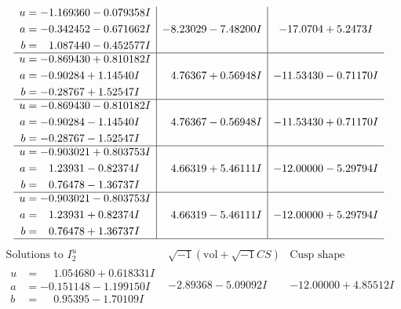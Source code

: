 \documentclass[1p]{elsarticle_modified}
\theoremstyle{definition}
\newcommand{\I}{\sqrt{-1}}
\begin{document}
$$\begin{array}{c|c|c}
\begin{aligned}
u &= -1.169360 - 0.079358 I \\
a &= -0.342452 - 0.671662 I \\
b &= \phantom{-}1.087440 - 0.452577 I\end{aligned}
 & -8.23029 - 7.48200 I & -17.0704 + 5.2473 I \\ \hline\begin{aligned}
u &= -0.869430 + 0.810182 I \\
a &= -0.90284 + 1.14540 I \\
b &= -0.28767 + 1.52547 I\end{aligned}
 & \phantom{-}4.76367 + 0.56948 I & -11.53430 - 0.71170 I \\ \hline\begin{aligned}
u &= -0.869430 - 0.810182 I \\
a &= -0.90284 - 1.14540 I \\
b &= -0.28767 - 1.52547 I\end{aligned}
 & \phantom{-}4.76367 - 0.56948 I & -11.53430 + 0.71170 I \\ \hline\begin{aligned}
u &= -0.903021 + 0.803753 I \\
a &= \phantom{-}1.23931 - 0.82374 I \\
b &= \phantom{-}0.76478 - 1.36737 I\end{aligned}
 & \phantom{-}4.66319 + 5.46111 I & -12.00000 - 5.29794 I \\ \hline\begin{aligned}
u &= -0.903021 - 0.803753 I \\
a &= \phantom{-}1.23931 + 0.82374 I \\
b &= \phantom{-}0.76478 + 1.36737 I\end{aligned}
 & \phantom{-}4.66319 - 5.46111 I & -12.00000 + 5.29794 I\\
 \hline 
 \end{array}$$\newpage$$\begin{array}{c|c|c}  
\text{Solutions to }I^u_{2}& \I (\text{vol} + \sqrt{-1}CS) & \text{Cusp shape}\\
 \hline 
\begin{aligned}
u &= \phantom{-}1.054680 + 0.618331 I \\
a &= -0.151148 - 1.199150 I \\
b &= \phantom{-}0.95395 - 1.70109 I\end{aligned}
 & -2.89368 - 5.09092 I & -12.00000 + 4.85512 I \\ \hline\begin{aligned}

\end{aligned}
\end{array}$$
\end{document}
